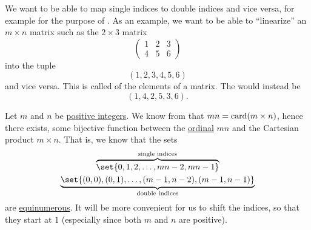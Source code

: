 \begin{remark}\label{rem:double_index_maps}
  We want to be able to map single indices to double indices and vice versa, for example for the purpose of . As an example, we want to be able to \enquote{linearize} an \( m \times n \) matrix such as the \( 2 \times 3 \) matrix
  \begin{equation}\label{eq:rem:double_index_maps/example/matrix}
    \begin{pmatrix}
      1 & 2 & 3 \\
      4 & 5 & 6
    \end{pmatrix}
  \end{equation}
  into the tuple
  \begin{equation}\label{eq:rem:double_index_maps/example/row_major}
    (1, 2, 3, 4, 5, 6)
  \end{equation}
  and vice versa. This is called  of the elements of a matrix. The  would instead be
  \begin{equation}\label{eq:rem:double_index_maps/example/column_major}
    (1, 4, 2, 5, 3, 6).
  \end{equation}

  Let \( m \) and \( n \) be \hyperref[rem:peano_arithmetic_zero/positive]{positive integers}. We know from  that \( mn = \operatorname{card}(m \times n) \), hence there exists, some bijective function between the \hyperref[def:ordinal]{ordinal} \( mn \) and the Cartesian product \( m \times n \). That is, we know that the sets
  \begin{gather*}
    \overbrace{ \set{ 0, 1, 2, \ldots, mn - 2, mn - 1 } }^{\T{single indices}}
    \\
    \underbrace{ \set{ (0, 0), (0, 1), \ldots, (m - 1, n - 2), (m - 1, n - 1) } }_{\T{double indices}}
  \end{gather*}
  are \hyperref[def:equinumerosity]{equinumerous}. It will be more convenient for us to shift the indices, so that they start at \( 1 \) (especially since both \( m \) and \( n \) are positive).


\end{remark}
